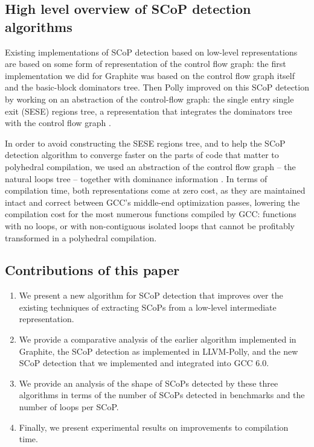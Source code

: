 \documentclass{sig-alternate}
\begin{document}
\subsection{High level overview of SCoP detection algorithms}

Existing implementations of SCoP detection based on low-level representations
are based on some form of representation of the control flow graph: the first
implementation we did for Graphite \cite{graphite} was based on the control flow
graph itself and the basic-block dominators tree.  Then Polly improved on this
SCoP detection \cite{polly} by working on an abstraction of the control-flow
graph: the single entry single exit (SESE) regions tree, a representation that
integrates the dominators tree with the control flow graph \cite{sese}.

In order to avoid constructing the SESE regions tree, and to help the SCoP
detection algorithm to converge faster on the parts of code that matter to
polyhedral compilation, we used an abstraction of the control flow graph -- the
natural loops tree \cite{dragonbook} -- together with dominance information
\cite{ramalingam}.  In terms of compilation time, both representations come at
zero cost, as they are maintained intact and correct between GCC's middle-end
optimization passes, lowering the compilation cost for the most numerous
functions compiled by GCC: functions with no loops, or with non-contiguous
isolated loops that cannot be profitably transformed in a polyhedral
compilation.

\subsection{Contributions of this paper}
\begin{enumerate}
  \item We present a new algorithm for SCoP detection that improves over the
    existing techniques of extracting SCoPs from a low-level intermediate
    representation.
  \item We provide a comparative analysis of the earlier algorithm implemented
    in Graphite, the SCoP detection as implemented in LLVM-Polly, and the new
    SCoP detection that we implemented and integrated into GCC 6.0.
  \item We provide an analysis of the shape of SCoPs detected by these three
    algorithms in terms of the number of SCoPs detected in benchmarks and the
    number of loops per SCoP.
  \item Finally, we present experimental results on improvements to compilation
    time.
\end{enumerate}
\end{document}
